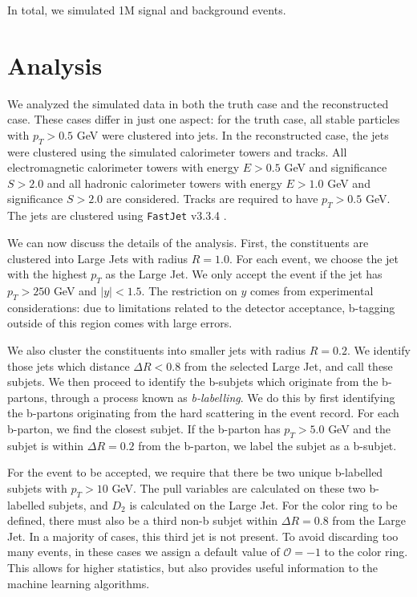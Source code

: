 \documentclass[10pt,a4paper]{book}
\def\code#1{\texttt{#1}}
\begin{document}
In total, we simulated 1M signal and background events.


\section{Analysis}

We analyzed the simulated data in both the truth case and the reconstructed case. These cases differ in just one aspect: for the truth case, all stable particles with $p_T > 0.5$ GeV were clustered into jets. In the reconstructed case, the jets were clustered using the simulated calorimeter towers and tracks. All electromagnetic calorimeter towers with energy $E > 0.5$ GeV and significance $S > 2.0$ and all hadronic calorimeter towers with energy $E > 1.0$ GeV and significance $S > 2.0$ are considered. Tracks are required to have $p_T > 0.5$ GeV. The jets are clustered using \code{FastJet} v3.3.4 \cite{Cacciari:2011ma}.

We can now discuss the details of the analysis. First, the constituents are clustered into Large Jets with radius $R=1.0$.  For  each  event,  we  choose  the jet with the highest $p_T$ as the Large Jet. We only accept the event if the jet has $p_T > 250$ GeV and $\vert y \vert < 1.5$. The restriction on $y$ comes from experimental considerations: due to limitations related to the detector acceptance, b-tagging outside of this region comes with large errors. 

We  also  cluster  the  constituents  into  smaller  jets with radius $R = 0.2$. We identify those jets which distance $\Delta R < 0.8$ from the selected Large Jet, and call these subjets. We then proceed to identify the b-subjets which originate from the b-partons, through a process known as \emph{b-labelling}. We do this by first identifying the b-partons originating from the hard scattering in the event record. For each b-parton, we find the closest subjet. If the b-parton has $p_T > 5.0$ GeV and the subjet is within $\Delta R = 0.2$ from the b-parton, we label the subjet as a b-subjet. 

For the event to be accepted, we require that there be two unique b-labelled subjets with $p_T > 10$ GeV. The pull variables are calculated on these two b-labelled subjets, and $D_2$ is calculated on the Large Jet. For the color ring to be defined, there must also be a third non-b subjet within $\Delta R = 0.8$ from the Large Jet. In a majority of cases, this third jet is not present. To avoid discarding too many events, in these cases we assign a default value of $\mathcal{O} = -1$ to the color ring. This allows for higher statistics, but also provides useful information to the machine learning algorithms.
\end{document}
